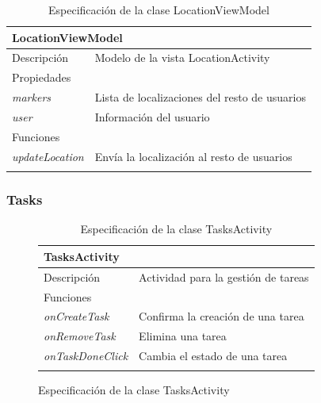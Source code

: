 \begin{longtable}{|p{} p{}|}
    \hline
    \multicolumn{2}{|l|}{LocationViewModel} \\ \hline \hline
    Descripción      & Modelo de la vista LocationActivity \\ \hline
    \multicolumn{2}{|l|}{Propiedades} \\
    \emph{markers}  & Lista de localizaciones del resto de usuarios  \\
    \emph{user}  & Información del usuario  \\ \hline
    \multicolumn{2}{|l|}{Funciones} \\
    \emph{updateLocation}  & Envía la localización al resto de usuarios \\ \hline
    \caption{Especificación de la clase LocationViewModel}
    \label{class:app:location_view_model}
\end{longtable}

\vspace{-31pt}
\subsubsection{Tasks}

\vspace{-21pt}
\begin{figure}[H]
\begin{longtable}{|p{} p{}|}
    \hline
    \multicolumn{2}{|l|}{TasksActivity} \\ \hline \hline
    Descripción      & Actividad para la gestión de tareas \\ \hline
    \multicolumn{2}{|l|}{Funciones} \\
    \emph{onCreateTask}  & Confirma la creación de una tarea \\
    \emph{onRemoveTask}  & Elimina una tarea  \\ 
    \emph{onTaskDoneClick}  & Cambia el estado de una tarea  \\ \hline
    \caption{Especificación de la clase TasksActivity}
    \label{class:app:tasks_activity}
\end{longtable}
\end{figure}

